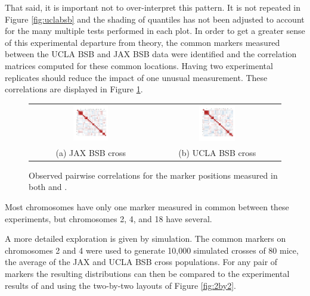 \documentclass{article}
\begin{document}
That said, it is important not to over-interpret this pattern. It is not repeated in Figure \ref{fig:uclabsb} and the shading of quantiles has not been adjusted to account for the many multiple tests performed in each plot. In order to get a greater sense of this experimental departure from theory, the common markers measured between the UCLA BSB and JAX BSB data were identified and the correlation matrices computed for these common locations. Having two experimental replicates should reduce the impact of one unusual measurement. These correlations are displayed in Figure \ref{fig:bsbcommon}.
\begin{figure}[htp]
  \begin{center}
    \begin{tabular}{cc}
      \includegraphics[width = 0.300\textwidth]{./img/jaxbsb_common.png} &
      \includegraphics[width = 0.300\textwidth]{./img/uclabsb_common.png} \\
      {\footnotesize (a) JAX BSB cross} &
      {\footnotesize (b) UCLA BSB cross} \\
    \end{tabular}
  \end{center}
  \caption{Observed pairwise correlations for the marker positions measured in both \cite{roweetal1994jaxbsb} and \cite{welchetal1996uclabsb}.}
  \label{fig:bsbcommon}
\end{figure}
Most chromosomes have only one marker measured in common between these experiments, but chromosomes 2, 4, and 18 have several.

A more detailed exploration is given by simulation. The common markers on chromosomes 2 and 4 were used to generate 10,000 simulated crosses of 80 mice, the average of the JAX and UCLA BSB cross populations. For any pair of markers the resulting distributions can then be compared to the experimental results of \cite{roweetal1994jaxbsb} and \cite{welchetal1996uclabsb} using the two-by-two layouts of Figure \ref{fig:2by2}.
\end{document}
